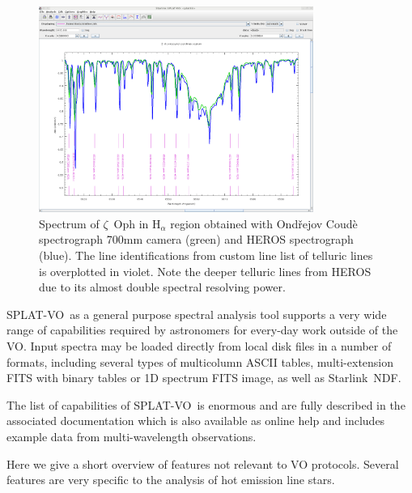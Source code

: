 \documentclass[final,authoryear,5p,times,twocolumn]{elsarticle}
\newcommand{\splatvo}{{\textsf{\small{SPLAT-VO}}}}
\newcommand{\Starlink}{\textsf{\small Starlink}}
\begin{document}
\begin{figure}[t]
\begin{center}
\includegraphics[width=0.8\textwidth]{zetoph2sp-id.pdf}
\caption{Spectrum of $\zeta$~Oph in H$_\alpha$ region  obtained with Ond\v{r}ejov Coud\`e
  spectrograph 700mm camera (green) and HEROS spectrograph (blue). The line
  identifications from custom line list of telluric lines is overplotted in violet. Note the deeper
  telluric lines from HEROS due to its almost double spectral resolving power.}
\label{fig:zetoph2sp-id}
\end{center}
\end{figure}

\splatvo\ as a general purpose spectral analysis tool supports a very wide
range of capabilities required by astronomers for every-day work outside of the
VO. Input spectra may be loaded directly from local disk files in a number of
formats, including several types of multicolumn ASCII tables, multi-extension
FITS with binary tables or 1D spectrum FITS image, as well as \Starlink\ NDF.

The list of capabilities of \splatvo\ is enormous and are fully described in
the associated documentation \citep[SUN/243;][]{sun243} which is also available
as online help and includes example data from multi-wavelength observations.

Here we give a short overview of features not relevant to VO protocols.
Several features are very specific to the analysis of hot emission line stars.
\end{document}
